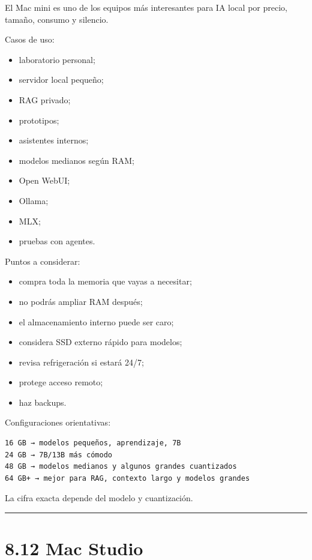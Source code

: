 El Mac mini es uno de los equipos más interesantes para IA local por
precio, tamaño, consumo y silencio.

Casos de uso:

\begin{itemize}
\tightlist
\item
  laboratorio personal;
\item
  servidor local pequeño;
\item
  RAG privado;
\item
  prototipos;
\item
  asistentes internos;
\item
  modelos medianos según RAM;
\item
  Open WebUI;
\item
  Ollama;
\item
  MLX;
\item
  pruebas con agentes.
\end{itemize}

Puntos a considerar:

\begin{itemize}
\tightlist
\item
  compra toda la memoria que vayas a necesitar;
\item
  no podrás ampliar RAM después;
\item
  el almacenamiento interno puede ser caro;
\item
  considera SSD externo rápido para modelos;
\item
  revisa refrigeración si estará 24/7;
\item
  protege acceso remoto;
\item
  haz backups.
\end{itemize}

Configuraciones orientativas:

\begin{lstlisting}
16 GB → modelos pequeños, aprendizaje, 7B
24 GB → 7B/13B más cómodo
48 GB → modelos medianos y algunos grandes cuantizados
64 GB+ → mejor para RAG, contexto largo y modelos grandes
\end{lstlisting}

La cifra exacta depende del modelo y cuantización.

\begin{center}\rule{0.5\linewidth}{0.5pt}\end{center}

\section{8.12 Mac Studio}\label{mac-studio}

